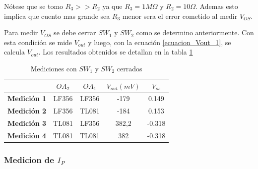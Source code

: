 \documentclass[12pt,a4paper]{article}
\begin{document}
Nótese que se tomo $R_3 >> R_2$ ya que $R_3 = 1M\Omega $ y $R_2 = 10\Omega$. Ademas esto implica que cuento mas grande sea $R_3$ menor sera el error cometido al medir $V_{OS}$.  

Para medir $V_{OS}$ se debe cerrar $SW_1$ y $SW_2$ como se determino anteriormente. Con esta condición se mide $V_{out}$ y luego, con la ecuación \ref{ecuacion_Vout_1}, se calcula $V_{out}$. Los resultados obtenidos se detallan en la tabla \ref{table2}

\begin{table}[h!]
    \centering
    \caption{Mediciones con $SW_1$ y $SW_2$ cerrados}
    \label{table2}
    \begin{tabular}{@{}ccccc@{}}
    
    \textbf{}           & \textbf{$OA_2$} & \textbf{$OA_1$} & \textbf{$V_{out}(mV)$} & \textbf{$V_{os}$} \\ \midrule
    \textbf{Medición 1} & LF356          & LF356          & -179              &  0.149            \\
    \textbf{Medición 2} & LF356          & TL081          & -184              &  0.153            \\
    \textbf{Medición 3} & TL081          & LF356          & 382,2             &  -0.318            \\
    \textbf{Medición 4} & TL081          & TL081          & 382               &  -0.318            \\ 
    \end{tabular}
\end{table}


\subsubsection{Medicion de $I_{P}$}
\end{document}
